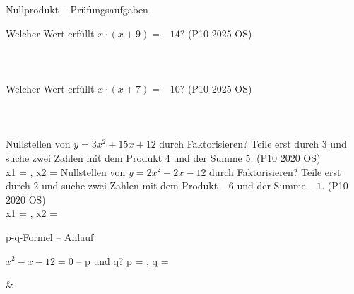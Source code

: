 \begin{aufgabe}{Nullprodukt – Prüfungsaufgaben}
\begin{teile}
\teil Welcher Wert erfüllt $x \cdot (x + 9) = -14$? \hfill (P10 2025 OS)\\  \\  \\  \\ 
\teil Welcher Wert erfüllt $x \cdot (x + 7) = -10$? \hfill (P10 2025 OS)\\  \\  \\  \\ 
\steil Nullstellen von $y = 3x^2 + 15x + 12$ durch Faktorisieren? Teile erst durch $3$ und suche zwei Zahlen mit dem Produkt $4$ und der Summe $5$. \hfill (P10 2020 OS) \\ x1 = \leerfeld , x2 = \leerfeld
\steil Nullstellen von $y = 2x^2 - 2x - 12$ durch Faktorisieren? Teile erst durch $2$ und suche zwei Zahlen mit dem Produkt $-6$ und der Summe $-1$. \hfill (P10 2020 OS) \\ x1 = \leerfeld , x2 = \leerfeld
\end{teile}
\end{aufgabe}

\begin{aufgabe}{p-q-Formel – Anlauf}
\begin{teile}
\teil $x^2 - x - 12 = 0$ – p und q? p = \leerfeld , q = \leerfeld
\end{teile}
\begin{gleichungsraster}[2]
 &
 \\
\end{gleichungsraster}
\end{aufgabe}

